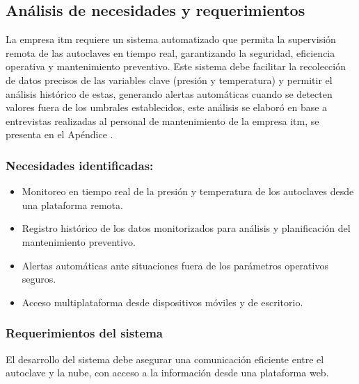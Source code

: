 \subsection{Análisis de necesidades y requerimientos}

La empresa \acrshort{itm} requiere un sistema automatizado que permita la supervisión remota de las autoclaves en tiempo real, garantizando la seguridad, eficiencia operativa y mantenimiento preventivo. Este sistema debe facilitar la recolección de datos precisos de las variables clave (presión y temperatura) y permitir el análisis histórico de estas, generando alertas automáticas cuando se detecten valores fuera de los umbrales establecidos, este análisis se elaboró en base a entrevistas realizadas al personal de mantenimiento de la empresa \acrshort{itm}, se presenta en el Apéndice .

\subsubsection{Necesidades identificadas:}
\begin{itemize}
    \item Monitoreo en tiempo real de la presión y temperatura de los autoclaves desde una plataforma remota.
    \item Registro histórico de los datos monitorizados para análisis y planificación del mantenimiento preventivo.
    \item Alertas automáticas ante situaciones fuera de los parámetros operativos seguros.
    \item Acceso multiplataforma desde dispositivos móviles y de escritorio.
\end{itemize}

\subsubsection{Requerimientos del sistema}

El desarrollo del sistema debe asegurar una comunicación eficiente entre el autoclave y la nube, con acceso a la información desde una plataforma web.

